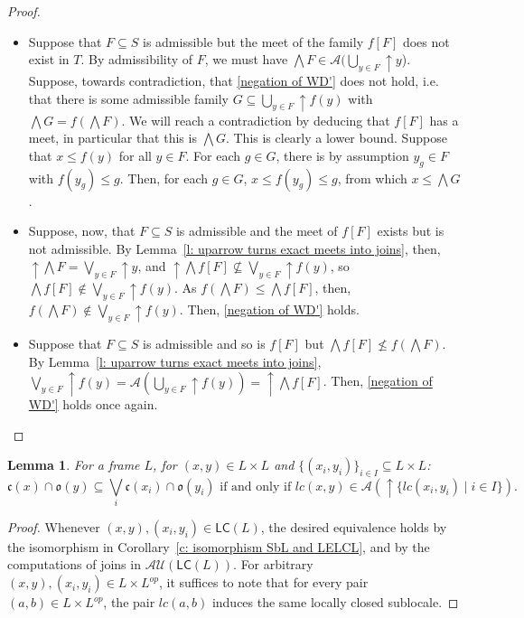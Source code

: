 \documentclass[11pt,a4paper,reqno]{amsart}
\newcommand{\tbigwedge}{\mathop{\textstyle \bigwedge }}%
\newcommand{\tbigcup}{\mathop{\textstyle \bigcup }}%
\newcommand{\tbigvee}{\mathop{\textstyle \bigvee }}%
\def\cl{\mathfrak{c}}
\def\op{\mathfrak{o}}
\newtheorem{lemma}[theorem]{Lemma}
\theoremstyle{definition}
\theoremstyle{remark}
\newcommand{\ca}[1]{\mathcal{#1}}
\newcommand{\mf}{\mathsf}
\newcommand{\mi}{\mathit}
\newcommand{\se}{\subseteq}
\newcommand{\up}{{\uparrow}}
\begin{document}
{\begin{proof}
\begin{itemize}
    \item Suppose that $F\se S$ is admissible but the meet of the family $f[F]$ does not exist in $T$. By admissibility of $F$, we must have $\tbigwedge F\in\ca{A}(\tbigcup_{y\in F}\up y$). Suppose, towards contradiction, that \eqref{negation of WD'} does not hold, i.e. that there is some admissible family $G\subseteq \tbigcup_{y\in F}\up f(y)$ with $\tbigwedge G=f(\tbigwedge F)$. We will reach a contradiction by deducing that $f[F]$ has a meet, in particular that this is $\tbigwedge G$. This is clearly a lower bound. Suppose that $x\leq f(y)$ for all $y\in F$. For each $g\in G$, there is by assumption $y_g\in F$ with $f(y_g)\leq g$. Then, for each $g\in G$, $x\leq f(y_g)\leq g$, from which $x\leq \tbigwedge G$.
    \item Suppose, now, that $F\se S$ is admissible and the meet of $f[F]$ exists but is not admissible. By Lemma~\ref{l: uparrow turns exact meets into joins}, then, $\up \tbigwedge F=\tbigvee_{y\in F}\up y$, and $\up \tbigwedge f[F]\nsubseteq\tbigvee_{y\in F}\up f(y)$, so $ \tbigwedge f[F]\notin\tbigvee_{y\in F}\up f(y)$. As $f(\tbigwedge F)\leq \tbigwedge f[F]$, then, $f(\tbigwedge F)\notin \tbigvee_{y\in F}\up f(y)$. Then, \eqref{negation of WD'} holds.
    \item Suppose that $F\se S$ is admissible and so is $f[F]$ but $\tbigwedge f[F]\nleq f(\tbigwedge F)$. By Lemma~\ref{l: uparrow turns exact meets into joins}, $\tbigvee_{y\in F}\up f(y)=\ca{A}(\tbigcup_{y\in F}\up f(y))=\up \tbigwedge f[F]$. Then, \eqref{negation of WD'} holds once again.\qedhere
\end{itemize}
\end{proof}



\begin{lemma}\label{l: we link wd with wdb}
For a frame $L$, for $(x,y)\in L\times L$ and $\{(x_i,y_i)\}_{i\in I}\subseteq L\times L$:
\[
\cl(x)\cap \op(y)\se \tbigvee_i \cl(x_i)\cap \op(y_i)\text{ if and only if  }\mi{lc}(x,y)\in \ca{A}(\up \{\mi{lc}(x_i,y_i)\mid i\in I\}).
\]

\end{lemma}
\begin{proof}
   Whenever $(x,y),(x_i,y_i)\in \mf{LC}(L)$, the desired equivalence holds by the isomorphism in Corollary~\ref{c: isomorphism SbL and LELCL}, and by the computations of joins in $\ca{AU}(\mf{LC}(L))$. For arbitrary $(x,y),(x_i,y_i)\in L\times L^{op}$, it suffices to note that for every pair $(a,b)\in L\times L^{op}$, the pair $\mi{lc}(a,b)$ induces the same locally closed sublocale.
\end{proof}

}
\end{document}
